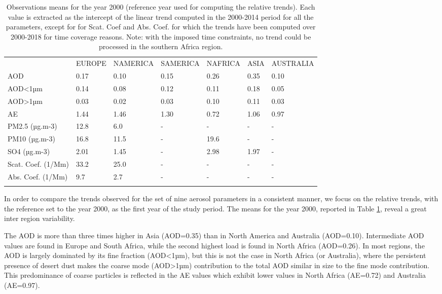\documentclass[journal abbreviation, manuscript]{copernicus}
\begin{document}
\begin{table}
 \begin{tabular}{lllllll}
  \tophline
                     & EUROPE & NAMERICA & SAMERICA & NAFRICA & ASIA & AUSTRALIA \\
  \middlehline
  AOD                & 0.17   & 0.10     & 0.15     & 0.26    & 0.35 & 0.10      \\
  AOD<1µm            & 0.14   & 0.08     & 0.12     & 0.11    & 0.18 & 0.05      \\
  AOD>1µm            & 0.03   & 0.02     & 0.03     & 0.10    & 0.11 & 0.03      \\
  AE                 & 1.44   & 1.46     & 1.30     & 0.72    & 1.06 & 0.97      \\
  PM2.5 (µg.m-3)     & 12.8   & 6.0      & -        & -       & -    & -         \\
  PM10 (µg.m-3)      & 16.8   & 11.5     & -        & 19.6    & -    & -         \\
  SO4 (µg.m-3)       & 2.01   & 1.45     & -        & 2.98    & 1.97 & -         \\
  Scat. Coef. (1/Mm) & 33.2   & 25.0     & -        & -       & -    & -         \\
  Abs. Coef. (1/Mm)  & 9.7    & 2.7      & -        & -       & -    & -         \\
  \bottomhline
 \end{tabular}

 \caption{Observations means for the year 2000 (reference year used for computing the relative trends). Each value is extracted as the intercept of the linear trend computed in the 2000-2014 period for all the parameters, except for for Scat. Coef and Abs. Coef. for which the trends have been computed over 2000-2018 for time coverage reasons. Note: with the imposed time constraints, no trend could be processed in the southern Africa region.}
 \label{table:obs_2000mean}
\end{table}

In order to compare the trends observed for the set of nine aerosol parameters in a consistent manner, we focus on the relative trends, with the reference set to the year 2000, as the first year of the study period. The means for the year 2000, reported in Table \ref{table:obs_2000mean}, reveal a great inter region variability.

The AOD is more than three times higher in Asia (AOD=0.35) than in North America and Australia (AOD=0.10). Intermediate AOD values are found in Europe and South Africa, while the second highest load is found in North Africa (AOD=0.26). In most regions, the AOD is largely dominated by its fine fraction (AOD<1µm), but this is not the case in North Africa (or Australia), where the persistent presence of desert dust makes the coarse mode (AOD>1µm) contribution to the total AOD similar in size to the fine mode contribution. This predominance of coarse particles is reflected in the AE values which exhibit lower values in North Africa (AE=0.72) and Australia (AE=0.97).
\end{document}

